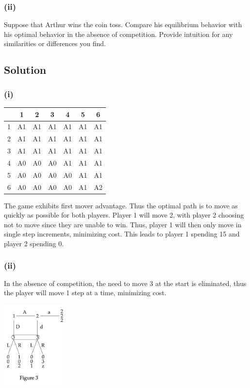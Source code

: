\documentclass[10pt, a4paper]{article}
\begin{document}
  \subsubsection*{(ii)} 
  Suppose that Arthur wins the coin toss. Compare his equilibrium behavior with his optimal behavior in the absence of competition. Provide intuition for any similarities or differences you find.
  \subsection*{Solution}
    \subsubsection*{(i)}
      \begin{center}
        \begin{tabular}{|c|c|c|c|c|c|c|}
          \hline
          & 1 & 2 & 3 & 4 & 5 & 6 \\
          \hline
          1 & A1 & A1 & A1 & A1 & A1 & A1 \\
          2 & A1 & A1 & A1 & A1 & A1 & A1 \\
          3 & A1 & A1 & A1 & A1 & A1 & A1 \\
          4 & A0 & A0 & A0 & A1 & A1 & A1 \\
          5 & A0 & A0 & A0 & A0 & A1 & A1 \\
          6 & A0 & A0 & A0 & A0 & A1 & A2 \\
          \hline
        \end{tabular}
      \end{center}
    The game exhibits first mover advantage. Thus the optimal path is to move as quickly as possible for both players. Player 1 will move 2, with player 2 choosing not to move since they are unable to win. Thus, player 1 will then only move in single step increments, minimizing cost. This leads to player 1 spending 15 and player 2 spending 0. 
  \subsubsection*{(ii)}
    In the absence of competition, the need to move 3 at the start is eliminated, thus the player will move 1 step at a time, minimizing cost.
  \begin{center}
    \includegraphics[width=0.25\textwidth]{fig3.png}
  \end{center}
\end{document}
